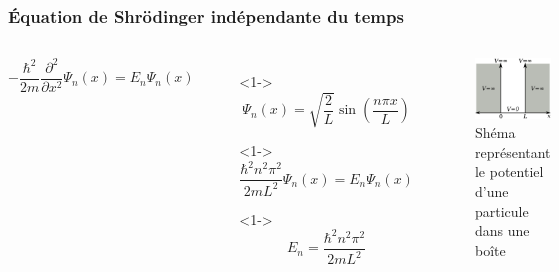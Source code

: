 \documentclass[aspectratio=169]{beamer}
\begin{document}
\begin{frame}
\frametitle{Équation de Shrödinger indépendante du temps}

\begin{columns}

\begin{equation}\tag{4}
-\frac{\hbar^2}{2m}\frac{\partial^2}{\partial x^2}\Psi_n(x)=E_n\Psi_n(x)
\end{equation} 

\begin{itemize}
\item[]<1-> \begin{equation}\tag{5}
\Psi_n(x)=\sqrt{\frac{2}{L}}\sin(\frac{n\pi x}{L})
\end{equation}  
\item[]<1-> \begin{equation}\tag{6}
\frac{\hbar^2n^2\pi^2}{2mL^2}  \Psi_n(x)=E_n\Psi_n(x)
\end{equation}  

\item[]<1-> \begin{equation}\tag{8}
E_n=\frac{\hbar^2n^2\pi^2}{2mL^2} 
\end{equation} 

\end{itemize}
\begin{figure}[h]
\includegraphics[scale=0.4]{Pot}
\caption{Shéma représentant le potentiel d'une particule dans une boîte}
\end{figure}
\end{columns}

\end{frame}
\end{document}

